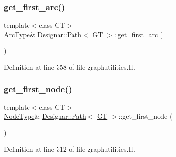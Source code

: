 \subsubsection{\texorpdfstring{get\+\_\+first\+\_\+arc()}{get\_first\_arc()}}
{\footnotesize\ttfamily template$<$class GT$>$ \\
\hyperlink{class_designar_1_1_path_a6e13966351659cedcf3233098b2b7384}{Arc\+Type}\& \hyperlink{class_designar_1_1_path}{Designar\+::\+Path}$<$ \hyperlink{demo-buildgraph_8_c_a3001c40d2c31ca87ed96cd7d1334a55e}{GT} $>$\+::get\+\_\+first\+\_\+arc (\begin{DoxyParamCaption}{ }\end{DoxyParamCaption})\hspace{0.3cm}{\ttfamily [inline]}}



Definition at line 358 of file graphutilities.\+H.

\mbox{\label{class_designar_1_1_path_a7d45c6df09b310fc0c0a65bd3c8db109}} 
\subsubsection{\texorpdfstring{get\+\_\+first\+\_\+node()}{get\_first\_node()}\hspace{0.1cm}{\footnotesize\ttfamily [1/2]}}
{\footnotesize\ttfamily template$<$class GT$>$ \\
\hyperlink{class_designar_1_1_path_a7b499fd50e96e3360968d4cfef7a3736}{Node\+Type}\& \hyperlink{class_designar_1_1_path}{Designar\+::\+Path}$<$ \hyperlink{demo-buildgraph_8_c_a3001c40d2c31ca87ed96cd7d1334a55e}{GT} $>$\+::get\+\_\+first\+\_\+node (\begin{DoxyParamCaption}{ }\end{DoxyParamCaption})\hspace{0.3cm}{\ttfamily [inline]}}



Definition at line 312 of file graphutilities.\+H.

\mbox{\label{class_designar_1_1_path_a6750bfef2944f6c938bee68da8c904c6}} 
